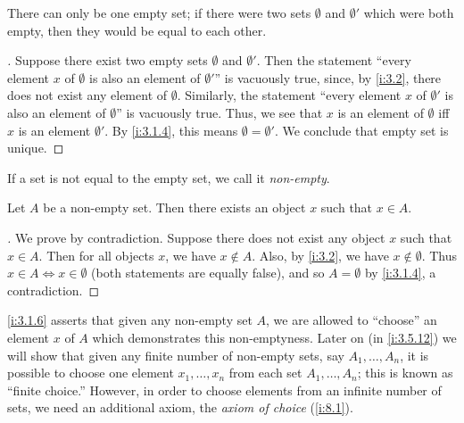 \begin{ac}\label{i:ac:3.1.2}
  There can only be one empty set;
  if there were two sets \(\emptyset\) and \(\emptyset'\) which were both empty, then they would be equal to each other.
\end{ac}

\begin{proof}[]
  Suppose there exist two empty sets \(\emptyset\) and \(\emptyset'\).
  Then the statement ``every element \(x\) of \(\emptyset\) is also an element of \(\emptyset'\)'' is vacuously true, since, by \cref{i:3.2}, there does not exist any element of \(\emptyset\).
  Similarly, the statement ``every element \(x\) of \(\emptyset'\) is also an element of \(\emptyset\)'' is vacuously true.
  Thus, we see that \(x\) is an element of \(\emptyset\) iff \(x\) is an element \(\emptyset'\).
  By \cref{i:3.1.4}, this means \(\emptyset = \emptyset'\).
  We conclude that empty set is unique.
\end{proof}

\begin{note}
  If a set is not equal to the empty set, we call it \emph{non-empty}.
\end{note}

\setcounter{thm}{5}
\begin{lem}\label{i:3.1.6}
  Let \(A\) be a non-empty set.
  Then there exists an object \(x\) such that \(x \in A\).
\end{lem}

\begin{proof}[]
  We prove by contradiction.
  Suppose there does not exist any object \(x\) such that \(x \in A\).
  Then for all objects \(x\), we have \(x \notin A\).
  Also, by \cref{i:3.2}, we have \(x \notin \emptyset\).
  Thus \(x \in A \iff x \in \emptyset\) (both statements are equally false), and so \(A = \emptyset\) by \cref{i:3.1.4}, a contradiction.
\end{proof}

\begin{rmk}\label{i:3.1.7}
  \cref{i:3.1.6} asserts that given any non-empty set \(A\), we are allowed to ``choose'' an element \(x\) of \(A\) which demonstrates this non-emptyness.
  Later on (in \cref{i:3.5.12}) we will show that given any finite number of non-empty sets, say \(A_1, \dots, A_n\), it is possible to choose one element \(x_1, \dots, x_n\) from each set \(A_1, \dots, A_n\);
  this is known as ``finite choice.''
  However, in order to choose elements from an infinite number of sets, we need an additional axiom, the \emph{axiom of choice} (\cref{i:8.1}).
\end{rmk}


